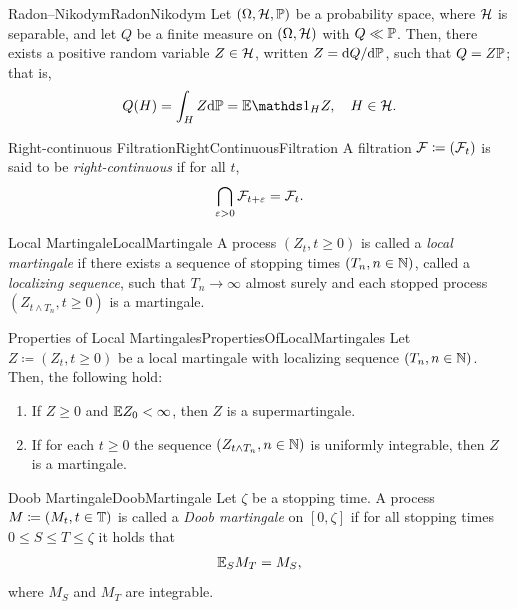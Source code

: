 \begin{thm}{Radon--Nikodym}{RadonNikodym}
	Let $(\Omega, \mathcal{H}, \mathbb{P})$ be a probability space, where $\mathcal{H}$ is separable, and let $Q$ be a finite measure on $(\Omega, \mathcal{H})$ with $Q \ll \mathbb{P}$. Then, there exists a positive random variable $Z \in \mathcal{H}$, written $Z = \mathrm{d} Q / \mathrm{d} \mathbb{P}$, such that $Q = Z \mathbb{P}$; that is,
	\begin{equation}\label{eq:RadonNikodymFormula}
		Q(H) = \int_H Z \di \Pm = \E \I_H Z, \quad H \in \cH.
	\end{equation}
\end{thm}

\begin{defn}{Right-continuous Filtration}{RightContinuousFiltration}
	A filtration $\mathcal{F} \coloneqq (\mathcal{F}_t)$ is said to be \emph{right-continuous} if for all $t$,
	\begin{equation*}
		\bigcap_{\varepsilon > 0} \mathcal{F}_{t+\varepsilon} = \mathcal{F}_t.
	\end{equation*}
\end{defn}

\begin{defn}{Local Martingale}{LocalMartingale}
	A process $(Z_t, t \ge 0)$ is called a \emph{local martingale} if there exists a sequence of stopping times $(T_n, n \in \mathbb{N})$, called a \emph{localizing sequence}, such that $T_n \to \infty$ almost surely and each stopped process $(Z_{t \land T_n}, t \ge 0)$ is a martingale.
\end{defn}

\begin{thm}{Properties of Local Martingales}{PropertiesOfLocalMartingales}
	Let $Z \coloneqq (Z_t, t \ge 0)$ be a local martingale with localizing sequence $(T_n, n \in \mathbb{N})$. Then, the following hold:
	\begin{enumerate}
		\item If $Z \ge 0$ and $\mathbb{E} Z_0 < \infty$, then $Z$ is a supermartingale.
		\item If for each $t \ge 0$ the sequence $(Z_{t \land T_n}, n \in \mathbb{N})$ is uniformly integrable, then $Z$ is a martingale.
	\end{enumerate}
\end{thm}

\begin{defn}{Doob Martingale}{DoobMartingale}
	Let $\zeta$ be a stopping time. A process $M \coloneqq (M_t, t \in \mathbb{T})$ is called a \emph{Doob martingale} on $[0, \zeta]$ if for all stopping times $0 \le S \le T \le \zeta$ it holds that
	\begin{equation}\label{eq:DoobMartingaleCondition}
		\mathbb{E}_S M_T = M_S,
	\end{equation}
	where $M_S$ and $M_T$ are integrable.
\end{defn}

